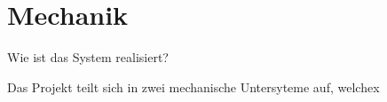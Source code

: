 \section{Mechanik}
\label{sec:Mechanik}

Wie ist das System realisiert?

Das Projekt teilt sich in zwei mechanische Untersyteme auf, welchex